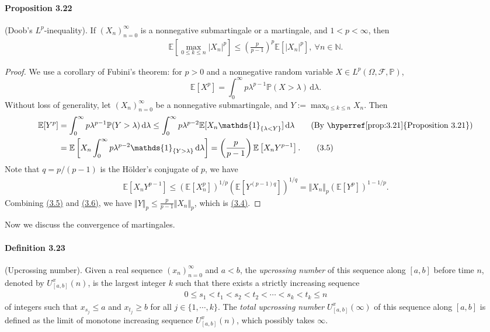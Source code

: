 \documentclass{article}
\numberwithin{equation}{section}
\newcommand{\E}{\mathbb{E}}
\renewcommand{\P}{\mathbb{P}}
\renewcommand{\d}{\mathrm{d}}
\theoremstyle{plain}
\theoremstyle{definition}
\begin{document}
\paragraph{Proposition 3.22\label{prop:3.22}} (Doob's $L^p$-inequality). If $(X_n)_{n=0}^\infty$ is a nonnegative submartingale or a martingale, and $1< p<\infty$, then
\begin{align*}
	\E\left[\max_{0\leq k\leq n}\vert X_n\vert^p\right]\leq\left(\frac{p}{p-1}\right)^p\E\left[\vert X_n\vert^p\right],\ \forall n\in\mathbb{N}.\tag{3.4}\label{eq:3.4}
\end{align*}
\begin{proof}
We use a corollary of Fubini's theorem: for $p>0$ and a nonnegative random variable $X\in L^p(\Omega,\mathscr{F},\P)$,
$$\E[X^p]=\int_0^\infty p\lambda^{p-1}\P(X>\lambda)\,\d \lambda.$$
Without loss of generality, let $(X_n)_{n=0}^\infty$ be a nonnegative submartingale, and $Y:=\max_{0\leq k\leq n}X_n$. Then
\begin{align*}
	\E[Y^p] &= \int_0^\infty p\lambda^{p-1}\P(Y>\lambda)\,\d \lambda\leq \int_0^\infty p\lambda^{p-2}\E[X_n\mathds{1}_{\{\lambda<Y\}}]\,\d \lambda\tag{By \hyperref[prop:3.21]{Proposition 3.21}}\\
	&=\E\left[X_n\int_0^\infty p\lambda^{p-2}\mathds{1}_{\{Y>\lambda\}}\,\d \lambda\right] = \left(\frac{p}{p-1}\right)\E\left[X_nY^{p-1}\right].\tag{3.5}\label{eq:3.5}
\end{align*}
Note that $q=p/(p-1)$ is the Hölder's conjugate of $p$, we have
\begin{align*}
	\E\left[X_nY^{p-1}\right]\leq\left(\E[X_n^p]\right)^{1/p}\left(\E[Y^{(p-1)q}]\right)^{1/q} = \Vert X_n\Vert_p\left(\E[Y^p]\right)^{1-1/p}.\tag{3.6}\label{eq:3.6}
\end{align*}
Combining \hyperref[eq:3.5]{(3.5)} and \hyperref[eq:3.6]{(3.6)}, we have $\Vert Y\Vert_p\leq\frac{p}{p-1}\Vert X_n\Vert_p$, which is \hyperref[eq:3.4]{(3.4)}.
\end{proof}

Now we discuss the convergence of martingales.
\paragraph{Definition 3.23\label{def:3.23}} (Upcrossing number). Given a real sequence $(x_n)_{n=0}^\infty$ and $a<b$, the \textit{upcrossing number} of this sequence along $[a,b]$ before time $n$, denoted by $U_{[a,b]}^x(n)$, is the largest integer $k$ such that there exists a strictly increasing sequence
\begin{align*}
	0\leq s_1<t_1<s_2<t_2<\cdots<s_k<t_k\leq n
\end{align*}
of integers such that $x_{s_j}\leq a$ and $x_{t_j}\geq b$ for all $j\in\{1,\cdots,k\}$. The \textit{total upcrossing number} $U_{[a,b]}^x(\infty)$ of this sequence along $[a,b]$ is defined as the limit of monotone increasing sequence $U_{[a,b]}^x(n)$, which possibly takes $\infty$.
\end{document}
